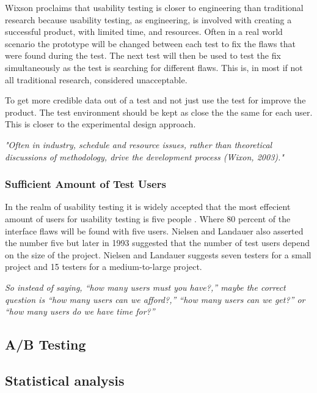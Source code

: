 Wixson proclaims that usability testing is closer to engineering than traditional research because usability testing, as engineering, is involved with creating a successful product, with limited time, and resources. Often in a real world scenario the prototype will be changed between each test to fix the flaws that were found during the test. The next test will then be used to test the fix simultaneously as the test is searching for different flaws. This is, in most if not all traditional research, considered unacceptable. 

To get more credible data out of a test and not just use the test for improve the product. The test environment should be kept as close the the same for each user. This is closer to the experimental design approach.

\textit{"Often in industry, schedule and resource issues, rather than theoretical discussions of methodology, drive the development process (Wixon, 2003)."}

\subsubsection{Sufficient Amount of Test Users}%
\label{ssub:Sufficient Amount of Test Users}
In the realm of usability testing it is widely accepted that the most effecient amount of users for usability testing is five people \cite{virzi1992refining}. Where 80 percent of the interface flaws will be found with five users. Nielsen and Landauer also asserted the number five but later in 1993 suggested that the number of test users depend on the size of the project\cite{nielsen1993mathematical}. Nielsen and Landauer suggests seven testers for a small project and 15 testers for a medium-to-large project. 


\textit{
So instead of saying, “how many users must you have?,” maybe the correct question is “how many users can we afford?,” “how many users can we get?” or “how many users do we have time for?”
} \cite{lazar2017research} 



\cite{nielsen1994estimating} 

\cite{nielsen1994heuristic} 


\subsection{A/B Testing}%
\label{sub:A/B Testing}




\subsection{Statistical analysis}%
\label{sub:Statistical analysis}

